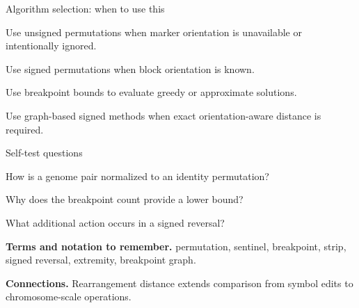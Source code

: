 \documentclass[11pt,letterpaper]{article}
\begin{document}
\begin{CornellOverviewBox}{Algorithm selection: when to use this}
\begin{CornellChecklist}
  \item Use unsigned permutations when marker orientation is unavailable or intentionally ignored.
  \item Use signed permutations when block orientation is known.
  \item Use breakpoint bounds to evaluate greedy or approximate solutions.
  \item Use graph-based signed methods when exact orientation-aware distance is required.
\end{CornellChecklist}
\end{CornellOverviewBox}

\begin{CornellExamBox}{Self-test questions}
\begin{CornellRecallList}
  \item How is a genome pair normalized to an identity permutation?
  \item Why does the breakpoint count provide a lower bound?
  \item What additional action occurs in a signed reversal?
\end{CornellRecallList}
\end{CornellExamBox}

{\footnotesize
\textbf{Terms and notation to remember.} permutation, sentinel, breakpoint, strip, signed reversal, extremity, breakpoint graph.

\textbf{Connections.} Rearrangement distance extends comparison from symbol edits to chromosome-scale operations.
}
\end{document}
